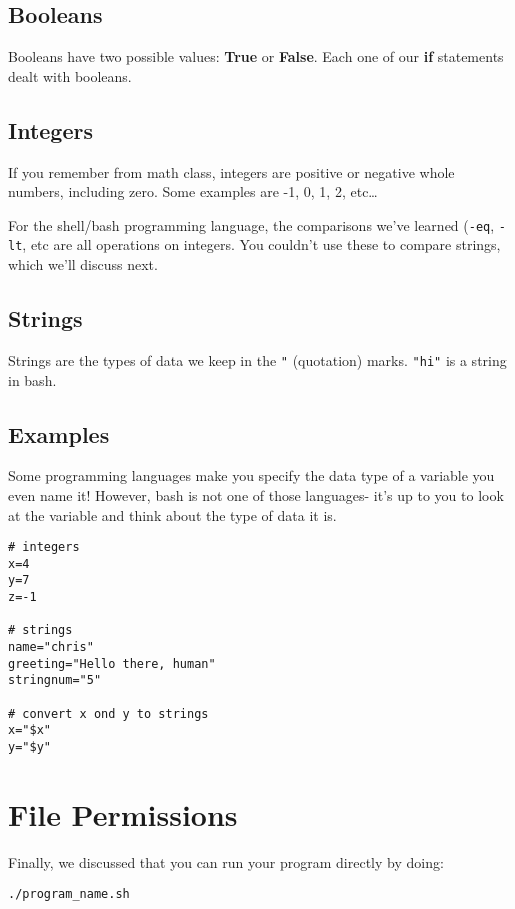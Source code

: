 \documentclass{article}
\begin{document}
\subsection*{Booleans}
Booleans have two possible values: \textbf{True} or \textbf{False}. Each one of
our \textbf{if} statements dealt with booleans.

\subsection*{Integers}
If you remember from math class, integers are positive or negative whole
numbers, including zero. Some examples are -1, 0, 1, 2, etc\dots

For the shell/bash programming language, the comparisons we've learned
(\texttt{-eq}, \texttt{-lt}, etc are all operations on integers. You couldn't
use these to compare strings, which we'll discuss next.

\subsection*{Strings}
Strings are the types of data we keep in the \texttt{"} (quotation) marks. \texttt{"hi"} is a string in bash.

\subsection*{Examples}
Some programming languages make you specify the data type of a variable you
even name it! However, bash is not one of those languages- it's up to you to
look at the variable and think about the type of data it is.

\begin{lstlisting}
# integers
x=4
y=7
z=-1

# strings
name="chris"
greeting="Hello there, human"
stringnum="5"

# convert x ond y to strings
x="$x"
y="$y"
\end{lstlisting}

\section*{File Permissions}
Finally, we discussed that you can run your program directly by doing:
\begin{lstlisting}
./program_name.sh
\end{lstlisting}
\end{document}
